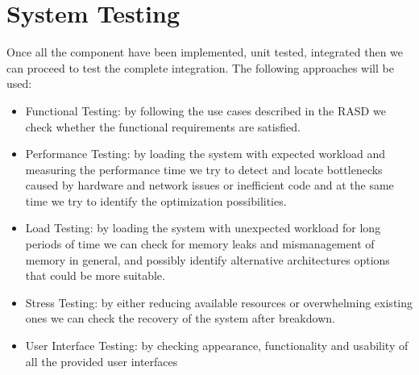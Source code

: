 \section{System Testing}\label{sec:testing-of-the-intergration}
Once all the component have been implemented, unit tested, integrated then we can proceed to test the complete integration.
The following approaches will be used: 
\begin{itemize}
    \item Functional Testing: by following the use cases described in the RASD we check whether the functional requirements are satisfied.
    \item Performance Testing: by loading the system with expected workload and measuring the performance time we try to detect and locate bottlenecks caused by hardware and network issues or inefficient code and at the same time we try to identify the optimization possibilities.
    \item Load Testing: by loading the system with unexpected workload for long periods of time we can check for memory leaks and mismanagement of memory in general, and possibly identify alternative architectures options that could be more suitable.
    \item Stress Testing: by either reducing available resources or overwhelming existing ones we can check the recovery of the system after breakdown.
    \item User Interface Testing: by checking appearance, functionality and usability of all the provided user interfaces
\end{itemize}